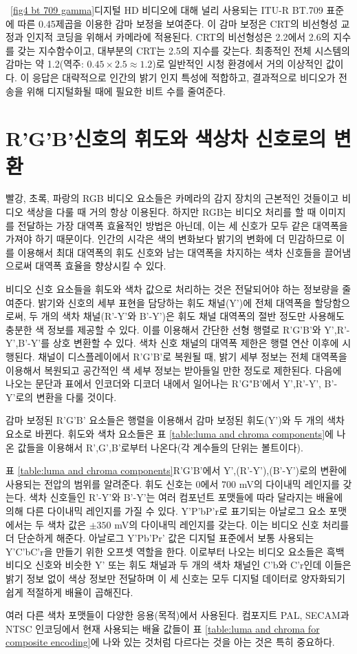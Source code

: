\figurename~\ref{fig4 bt 709 gamma}\는 디지털 HD 비디오에 대해 널리 사용되는 ITU-R BT.709 표준에 따른 0.45제곱을 이용한 감마 보정을 보여준다.
이 감마 보정은 CRT의 비선형성 교정과 인지적 코딩을 위해서 카메라에 적용된다. CRT의 비선형성은 2.2에서 2.6의 지수를 갖는 지수함수이고, 대부분의 CRT는 2.5의 지수를 갖는다.
최종적인 전체 시스템의 감마는 약 1.2(역주: $0.45\times 2.5\approx 1.2$)로 일반적인 시청 환경에서 거의 이상적인 값이다. 이 응답은 대략적으로 인간의 밝기 인지 특성에 적합하고, 결과적으로 비디오가 전송을 위해 디지털화될 때에 필요한 비트 수를 줄여준다.

\section{R'G'B'신호의 휘도와 색상차 신호로의 변환}
빨강, 초록, 파랑의 RGB 비디오 요소들은 카메라의 감지 장치의 근본적인 것들이고 비디오 색상을 다룰 때 거의 항상 이용된다.
하지만 RGB는 비디오 처리를 할 때 이미지를 전달하는 가장 대역폭 효율적인 방법은 아닌데, 이는 세 신호가 모두 같은 대역폭을 가져야 하기 때문이다.
인간의 시각은 색의 변화보다 밝기의 변화에 더 민감하므로 이를 이용해서 최대 대역폭의 휘도 신호와 남는 대역폭을 차지하는 색차 신호들을 끌어냄으로써 대역폭 효율을 향상시킬 수 있다.


비디오 신호 요소들을 휘도와 색차 값으로 처리하는 것은 전달되어야 하는 정보량을 줄여준다. 밝기와 신호의 세부 표현을 담당하는 휘도 채널(Y')에 전체 대역폭을 할당함으로써, 두 개의 색차 채널(R'-Y'와 B'-Y')은 휘도 채널 대역폭의 절반 정도만 사용해도 충분한 색 정보를 제공할 수 있다.
이를 이용해서 간단한 선형 행렬로 R'G'B'와 Y',R'-Y',B'-Y'를 상호 변환할 수 있다. 색차 신호 채널의 대역폭 제한은 행렬 연산 이후에 시행된다.
채널이 디스플레이에서 R'G'B'로 복원될 때, 밝기 세부 정보는 전체 대역폭을 이용해서 복원되고 공간적인 색 세부 정보는 받아들일 만한 정도로 제한된다.
다음에 나오는 문단과 표에서 인코더와 디코더 내에서 일어나는 R'G"B'에서 Y',R'-Y', B'-Y'로의 변환을 다룰 것이다.


감마 보정된 R'G'B' 요소들은 행렬을 이용해서 감마 보정된 휘도(Y')와 두 개의 색차 요소로 바뀐다. 휘도와 색차 요소들은 표 \ref{table:luma and chroma components}에 나온 값들을 이용해서 R',G',B'로부터 나온다(각 계수들의 단위는 볼트이다).


표 \ref{table:luma and chroma components}\은 R'G'B'에서 Y',(R'-Y'),(B'-Y')로의 변환에 사용되는 전압의 범위를 알려준다. 휘도 신호는 0에서 700 mV의 다이내믹 레인지를 갖는다.
색차 신호들인 R'-Y'와 B'-Y'는 여러 컴포넌트 포맷들에 따라 달라지는 배율에 의해 다른 다이내믹 레인지를 가질 수 있다. Y'P'bP'r로 표기되는 아날로그 요소 포맷에서는 두 색차 값은 $\pm 350$ mV의 다이내믹 레인지를 갖는다. 이는 비디오 신호 처리를 더 단순하게 해준다.
아날로그 Y'Pb'Pr' 값은 디지털 표준에서 보통 사용되는 Y'C'bC'r을 만들기 위한 오프셋 역할을 한다. 이로부터 나오는 비디오 요소들은 흑백 비디오 신호와 비슷한 Y' 또는 휘도 채널과 두 개의 색차 채널인 C'b와 C'r인데 이들은 밝기 정보 없이 색상 정보만 전달하며 이 세 신호는 모두 디지털 데이터로 양자화되기 쉽게 적절하게 배율이 곱해진다.


여러 다른 색차 포맷들이 다양한 응용(목적)에서 사용된다. 컴포지트 PAL, SECAM과 NTSC 인코딩에서 현재 사용되는 배율 값들이 표 \ref{table:luma and chroma for composite encoding}에 나와 있는 것처럼 다르다는 것을 아는 것은 특히 중요하다.
